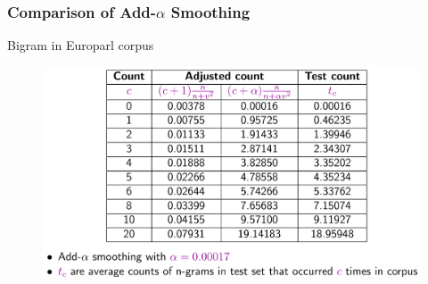 \documentclass{beamer}
\begin{document}
\begin{frame}\frametitle{Comparison of Add-$\alpha$ Smoothing}

\begin{block}{Bigram in Europarl corpus}

\begin{figure}
\includegraphics[width=0.9\linewidth]{figure/bigram_alpha_smoothing.pdf}
\label{fig:bigram_alpha_smoothing}
\end{figure}

\end{block}
\end{frame}








\end{document}
